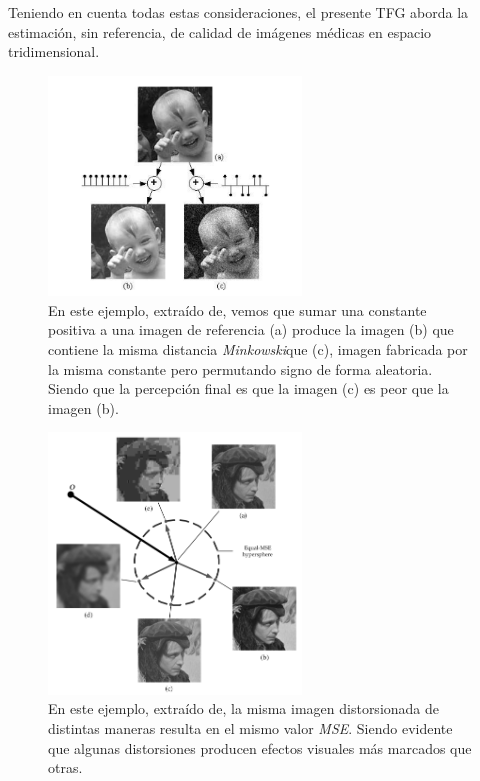 Teniendo en cuenta todas estas consideraciones, el presente TFG aborda la
estimación, sin referencia, de calidad de imágenes médicas en espacio tridimensional.

\begin{figure}[htp]
  \begin{center}
    \includegraphics[width=0.6\textwidth]{imagenes/chapter2/failure_minkowski_metric.png}
  \end{center}
  \caption{En este ejemplo, extraído de\cite{MinkowskiFailure},
  vemos que sumar una constante positiva a una imagen  de referencia (a) produce la imagen (b) que contiene la misma distancia \emph{Minkowski}\footnotemark[2]
  que (c), imagen fabricada por la misma constante pero permutando signo de forma aleatoria. Siendo que
  la percepción final es que la imagen (c) es peor que la imagen (b).
\label{fig:FailureMinkowskiMetric}}
\end{figure}
\begin{figure}[htp]
  \begin{center}
    \includegraphics[width=0.6\textwidth]{imagenes/chapter2/MSE_Hypersphere.png}
  \end{center}
  \caption{En este ejemplo, extraído de\cite{Wang2006ModernIQ}, la misma imagen distorsionada de distintas maneras
  resulta en el mismo valor \emph{MSE}. Siendo evidente que 
algunas distorsiones producen efectos visuales más marcados que otras.}
  \label{fig:MSEHyperSphere}
\end{figure}


